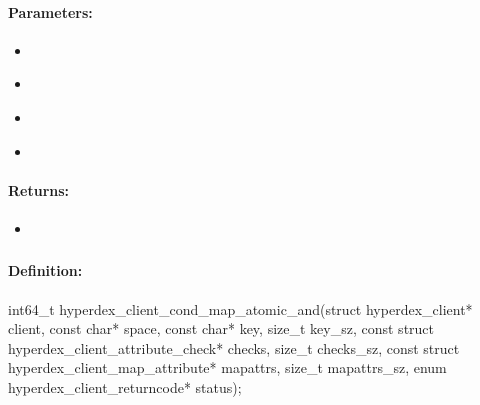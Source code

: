 \paragraph{Parameters:}
\begin{itemize}[noitemsep]
\item {}\\

\item {}\\

\item {}\\

\item {}\\

\end{itemize}

\paragraph{Returns:}
\begin{itemize}[noitemsep]
\item {}\\

\end{itemize}

\pagebreak
\subsubsection{}
\label{api:c:cond_map_atomic_and}


\paragraph{Definition:}
\begin{ccode}
int64_t hyperdex_client_cond_map_atomic_and(struct hyperdex_client* client,
        const char* space,
        const char* key, size_t key_sz,
        const struct hyperdex_client_attribute_check* checks, size_t checks_sz,
        const struct hyperdex_client_map_attribute* mapattrs, size_t mapattrs_sz,
        enum hyperdex_client_returncode* status);
\end{ccode}

